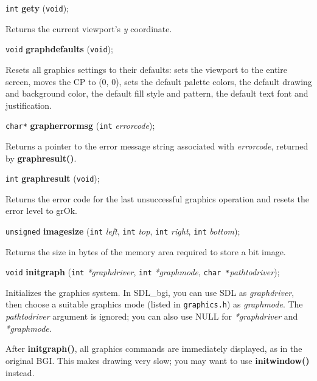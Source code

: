 \documentclass[a4paper,11pt]{article}
\newcommand{\SDLbgi}{SDL\_bgi}
\newcommand{\V}{\texttt{void}}      %
\newcommand{\I}{\texttt{int}}       %
\newcommand{\C}{\texttt{char *}}    %
\newcommand{\func}[1]{\textbf{#1}}  %
\newcommand{\A}[1]{\emph{#1}}       %
\newcommand{\F}[1]{\texttt{#1}}     %
\newenvironment{bgi}
{ %
  \begin{snugshade}
}
{ %
  \end{snugshade}
}
\begin{document}
\begin{bgi}
\I{} \func{gety} (\V{});
\end{bgi}

Returns the current viewport's \A{y} coordinate.


\begin{bgi}
\V{} \func{graphdefaults} (\V{});
\end{bgi}

Resets all graphics settings to their defaults: sets the viewport to
the entire screen, moves the CP to (0, 0), sets the default palette
colors, the default drawing and background color, the default fill
style and pattern, the default text font and justification.


\begin{bgi}
\texttt{char*} \func{grapherrormsg} (\I{} \A{errorcode});
\end{bgi}

Returns a pointer to the error message string associated with
\A{errorcode}, returned by \func{graphresult()}.


\begin{bgi}
\I{} \func{graphresult} (\V{});
\end{bgi}

Returns the error code for the last unsuccessful graphics operation
and resets the error level to grOk.


\begin{bgi}
\texttt{unsigned} \func{imagesize} (\I{} \A{left}, \I{} \A{top}, \I{}
\A{right}, \I{} \A{bottom});
\end{bgi}

Returns the size in bytes of the memory area required to store a bit
image.


\begin{bgi}
\V{} \func{initgraph} (\I{} \A{*graphdriver}, \I{} \A{*graphmode},
\C{}\A{pathtodriver});
\end{bgi}

Initializes the graphics system. In \SDLbgi, you can use SDL as
\A{graphdriver}, then choose a suitable graphics mode (listed in
\F{graphics.h}) as \A{graphmode}. The \A{pathtodriver} argument is
ignored; you can also use NULL for \A{*graphdriver} and
\A{*graphmode}.

After \func{initgraph()}, all graphics commands are immediately
displayed, as in the original BGI. This makes drawing very slow; you
may want to use \func{initwindow()} instead.
\end{document}
